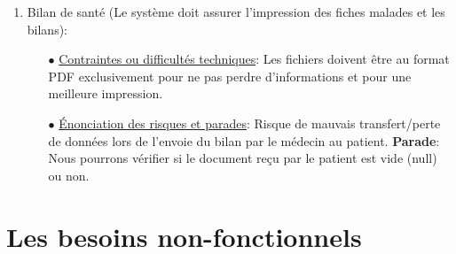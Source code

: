 \documentclass[a4paper]{report}
\begin{document}
\begin{enumerate}
    \item Bilan de santé (Le système doit assurer l’impression des fiches malades et les bilans): \newline
    \begin{itemize}
        \item[$\bullet$] \underline{Contraintes ou difficultés techniques}: Les fichiers doivent être au format PDF exclusivement pour ne pas perdre d’informations et pour une meilleure impression.
        \item[$\bullet$] \underline{Énonciation des risques et parades}: Risque de mauvais transfert/perte de données lors de l’envoie du bilan par le médecin au patient.\newline
        \textbf{Parade}: Nous pourrons vérifier si le document reçu par le patient est vide (null) ou non.
    \end{itemize}
\end{enumerate}

\section{Les besoins non-fonctionnels}
\end{document}
